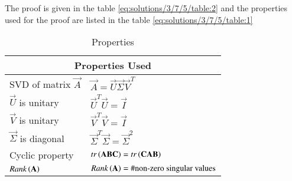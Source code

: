 The proof is given in the table \eqref{eq:solutions/3/7/5/table:2} and the properties used for the proof are listed in the table \eqref{eq:solutions/3/7/5/table:1}
\begin{table*}[ht!]
\begin{center}
\resizebox{2\columnwidth}{!}
{
\begin{tabular}{|l|l|}
\hline
\multicolumn{2}{|c|}{
\textbf{Properties Used}}\\
\hline
SVD of matrix $\vec{A}$ & $\vec{A}=\vec{U}\vec{\Sigma}\vec{V}^T$\\[0.5ex]
\hline
$\vec{U}$ is unitary & $\vec{U}^T\vec{U}=\vec{I}$\\[0.5ex] 
\hline
$\vec{V}$ is unitary & $\vec{V}^T\vec{V}=\vec{I}$\\[0.5ex] 
\hline
$\vec{\Sigma}$ is diagonal & $\vec{\Sigma}^T\vec{\Sigma}=\vec{\Sigma}^2$\\[0.5ex] 
\hline
Cyclic property & $tr\left(\mathbf{ABC}\right)=tr\left(\mathbf{CAB}\right)$\\[0.5ex] 
\hline
$Rank\left(\mathbf{A}\right)$ & $Rank\left(\mathbf{A}\right)=\# \text{non-zero singular values}$\\[0.5ex] 
\hline
\end{tabular}
}
\end{center}
\caption{Properties}
\label{eq:solutions/3/7/5/table:1}
\end{table*}
